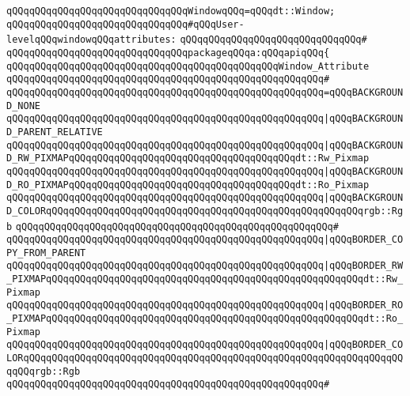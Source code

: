\verb|qQQqqQQqqQQqqQQqqQQqqQQqqQQqqQQqWindowqQQq=qQQqdt::Window;|\newline
\newline
\verb|qQQqqQQqqQQqqQQqqQQqqQQqqQQqqQQq#qQQqUser-levelqQQqwindowqQQqattributes:|\newline
\verb|qQQqqQQqqQQqqQQqqQQqqQQqqQQqqQQq#|\newline
\verb|qQQqqQQqqQQqqQQqqQQqqQQqqQQqqQQqpackageqQQqa:qQQqapiqQQq{|\newline
\newline
\verb|qQQqqQQqqQQqqQQqqQQqqQQqqQQqqQQqqQQqqQQqqQQqqQQqWindow_Attribute|\newline
\verb|qQQqqQQqqQQqqQQqqQQqqQQqqQQqqQQqqQQqqQQqqQQqqQQqqQQqqQQq#|\newline
\verb|qQQqqQQqqQQqqQQqqQQqqQQqqQQqqQQqqQQqqQQqqQQqqQQqqQQqqQQq=qQQqBACKGROUND_NONE|\newline
\verb|qQQqqQQqqQQqqQQqqQQqqQQqqQQqqQQqqQQqqQQqqQQqqQQqqQQqqQQq|\verb#|qQQqBACKGROUND_PARENT_RELATIVE#\newline
\verb|qQQqqQQqqQQqqQQqqQQqqQQqqQQqqQQqqQQqqQQqqQQqqQQqqQQqqQQq|\verb#|qQQqBACKGROUND_RW_PIXMAPqQQqqQQqqQQqqQQqqQQqqQQqqQQqqQQqqQQqqQQqdt::Rw_Pixmap#\newline
\verb|qQQqqQQqqQQqqQQqqQQqqQQqqQQqqQQqqQQqqQQqqQQqqQQqqQQqqQQq|\verb#|qQQqBACKGROUND_RO_PIXMAPqQQqqQQqqQQqqQQqqQQqqQQqqQQqqQQqqQQqqQQqdt::Ro_Pixmap#\newline
\verb|qQQqqQQqqQQqqQQqqQQqqQQqqQQqqQQqqQQqqQQqqQQqqQQqqQQqqQQq|\verb#|qQQqBACKGROUND_COLORqQQqqQQqqQQqqQQqqQQqqQQqqQQqqQQqqQQqqQQqqQQqqQQqqQQqqQQqrgb::Rgb#\newline
\verb|qQQqqQQqqQQqqQQqqQQqqQQqqQQqqQQqqQQqqQQqqQQqqQQqqQQqqQQq#|\newline
\verb|qQQqqQQqqQQqqQQqqQQqqQQqqQQqqQQqqQQqqQQqqQQqqQQqqQQqqQQq|\verb#|qQQqBORDER_COPY_FROM_PARENT#\newline
\verb|qQQqqQQqqQQqqQQqqQQqqQQqqQQqqQQqqQQqqQQqqQQqqQQqqQQqqQQq|\verb#|qQQqBORDER_RW_PIXMAPqQQqqQQqqQQqqQQqqQQqqQQqqQQqqQQqqQQqqQQqqQQqqQQqqQQqqQQqdt::Rw_Pixmap#\newline
\verb|qQQqqQQqqQQqqQQqqQQqqQQqqQQqqQQqqQQqqQQqqQQqqQQqqQQqqQQq|\verb#|qQQqBORDER_RO_PIXMAPqQQqqQQqqQQqqQQqqQQqqQQqqQQqqQQqqQQqqQQqqQQqqQQqqQQqqQQqdt::Ro_Pixmap#\newline
\verb|qQQqqQQqqQQqqQQqqQQqqQQqqQQqqQQqqQQqqQQqqQQqqQQqqQQqqQQq|\verb#|qQQqBORDER_COLORqQQqqQQqqQQqqQQqqQQqqQQqqQQqqQQqqQQqqQQqqQQqqQQqqQQqqQQqqQQqqQQqqQQqqQQqrgb::Rgb#\newline
\verb|qQQqqQQqqQQqqQQqqQQqqQQqqQQqqQQqqQQqqQQqqQQqqQQqqQQqqQQq#|\newline
